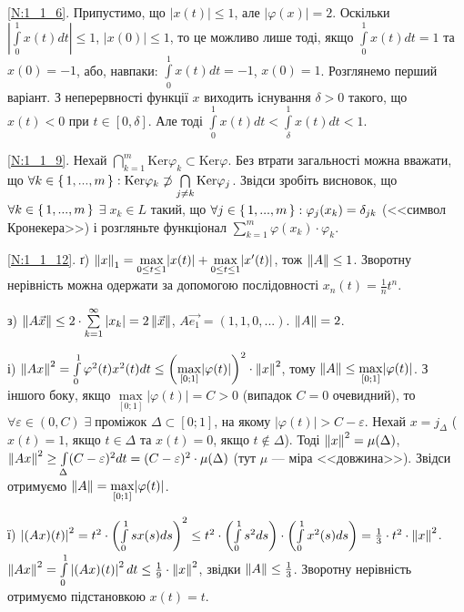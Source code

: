 
\noindent\ref{N:1_1_6}. Припустимо, що $|x(t)|\leq 1$, але $|\varphi(x)| = 2$.
Оскільки $|\int\limits^1_0 x(t) dt| \leq 1$, $|x(0)| \leq 1$, то це можливо лише тоді,
якщо $\int\limits^1_0 x(t) dt = 1$ та $x(0) = -1$, або, навпаки: $\int\limits^1_0 x(t) dt = -1$,
$x(0) = 1$. Розглянемо перший варіант. З неперервності функції $x$ виходить існування
$\delta > 0$ такого, що $x(t) < 0$ при $t \in [0,\delta]$. Але тоді 
$\int\limits^1_0 x(t) dt < \int\limits^1_\delta x(t) dt < 1$.

\noindent\ref{N:1_1_9}. Нехай $\bigcap\limits_{k=1}^m \mathrm{Ker} \varphi_k \subset \mathrm{Ker}\varphi$.
Без втрати загальності можна вважати, що $\forall k \in \set{1, ..., m}: \mathrm{Ker} \varphi_k \not\supset \bigcap\limits_{j \neq k} \mathrm{Ker} \varphi_j$.
Звідси зробіть висновок, що
$\forall k \in \set{1, ..., m}$ $\exists \; x_k \in L$
такий, що $\forall j \in \set{1, ..., m} : \varphi_j(x_k) = \delta_{jk}$ (<<символ Кронекера>>)
і розгляньте функціонал $\sum\limits_{k=1}^m \varphi(x_k) \cdot \varphi_k$.

\noindent\ref{N:1_1_12}.
ґ) $\left\lVert x\right\rVert_1 = \underset{0\leq t \leq 1}{\max} |x(t)| + \underset{0\leq t \leq 1}{\max} |x'(t)|$, тож $\left\lVert A\right\rVert \leq 1$.
Зворотну нерівність можна одержати за допомогою послідовності $x_n(t) = \frac{1}{n} t^n$.

\noindent з) $\left\lVert A\vec{x}\right\rVert \leq 2 \cdot \sum\limits_{k=1}^{\infty} |x_k| = 2 \left\lVert\vec{x}\right\rVert$, $A \vec{e_1} = (1, 1, 0, ...)$. $\left\lVert A\right\rVert = 2$.

\noindent і) $\left\lVert Ax\right\rVert^2 = \int\limits_0^1 \varphi^2 (t) x^2(t) dt \leq \left(\underset{[0;1]}{\max} |\varphi(t)|\right)^2 \cdot \left\lVert x\right\rVert^2 $, 
тому $\left\lVert A\right\rVert \leq \underset{[0;1]}{\max} |\varphi(t)|$.
З іншого боку, якщо $\underset{[0;1]}{\max} |\varphi(t)| = C > 0$ (випадок $C = 0$ очевидний), то
$\forall \varepsilon \in (0, C) \; \exists \; \text{проміжок } \Delta \subset [0;1]$,
на якому $|\varphi(t)| > C - \varepsilon$. Нехай $x = j_\Delta$ ($x(t) = 1$, якщо $t \in \Delta$ та $x(t) = 0$, якщо $t \notin \Delta$).
Тоді $\left\lVert x\right\rVert^2 = \mu(\Delta)$, $\left\lVert Ax\right\rVert^2 \geq \int\limits_\Delta (C-\varepsilon)^2 dt = (C-\varepsilon)^2 \cdot \mu(\Delta)$ (тут $\mu$ --- міра <<довжина>>).
Звідси отримуємо $\left\lVert A\right\rVert = \underset{[0;1]}{\max} |\varphi(t)|$.

\noindent ї) $\left| (Ax)(t) \right|^2 = t^2 \cdot \left( \int\limits_0^1 s x(s) ds\right)^2 \leq t^2 \cdot \left( \int\limits_0^1 s^2 ds\right) \cdot \left( \int\limits_0^1 x^2(s) ds\right) = \frac{1}{3} \cdot t^2 \cdot \left\lVert x\right\rVert^2$.
$\left\lVert Ax\right\rVert^2 = \int\limits_0^1 \left| (Ax)(t) \right|^2 dt \leq \frac{1}{9} \cdot \left\lVert x\right\rVert^2$, звідки $\left\lVert A\right\rVert \leq \frac{1}{3}$.
Зворотну нерівність отримуємо підстановкою $x(t) = t$.


